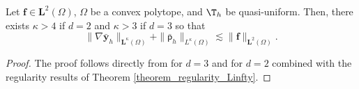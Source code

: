\documentclass[final]{siamart0216}
\begin{document}
\begin{proposition}
\label{pro:discrete_stability}
Let $\boldsymbol{\mathbf{f}} \in \mathbf{L}^2(\Omega)$, $\Omega$ be a convex polytope, and $\T_h$ be quasi-uniform. Then, there exists $\kappa > 4$ if $d=2$ and $\kappa >3$ if $d=3$ so that
 \begin{equation}
  \| \nabla \bar{\mathbf{y}}_h \|_{\mathbf{L}^{\kappa}(\Omega)} 
  +
  \| \bar{\mathsf{p}}_h \|_{L^\kappa(\Omega)}
  \lesssim \| \mathbf{f} \|_{\mathbf{L}^2(\Omega)}.
 \end{equation}
\end{proposition}
\begin{proof}
 The proof follows directly from \cite[Corollaries 4 and 5]{MR3422453} for $d=3$ and \cite[Theorems 8.2 and 8.4]{MR2121575} for $d=2$ combined with the regularity results of Theorem \ref{theorem_regularity_Linfty}.
\end{proof}
\end{document}
